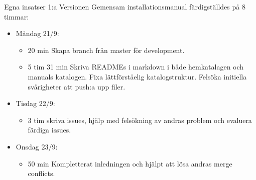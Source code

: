 \documentclass{TDP003mall}
\begin{document}
Egna insatser 1:a Versionen Gemensam installationsmanual färdigställdes på 8 timmar:
\begin{itemize}
	\item Måndag 21/9:
	\begin{itemize}
		\item 20 min Skapa branch från master för development.
		\item 5 tim 31 min Skriva READMEs i markdown i både hemkatalagen och manuals katalogen. Fixa lättförståelig katalogstruktur. Felsöka initiella svårigheter att push:a upp filer.
	\end{itemize}
	\item Tisdag 22/9:
	\begin{itemize}
                \item 3 tim skriva issues, hjälp med felsökning av andras problem och evaluera färdiga issues.
        \end{itemize}
        \item Onsdag 23/9:
        \begin{itemize}
                \item 50 min Kompletterat inledningen och hjälpt att lösa andras merge conflicts.\\
	\end{itemize}
\end{itemize}
\end{document}
